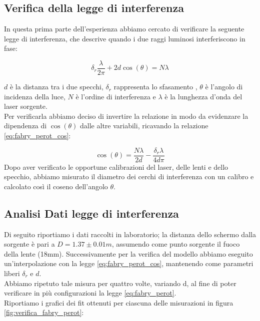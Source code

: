 \documentclass[letterpaper,12pt]{article}
\begin{document}
\subsection{Verifica della legge di interferenza}

In questa prima parte dell'esperienza abbiamo cercato di verificare
la seguente legge di interferenza, che descrive quando i due raggi luminosi interferiscono in fase:

\begin{equation}
    \delta_r \frac{\lambda}{2 \pi} + 2d \cos(\theta) = N \lambda
    \label{eq:fabry_perot}
\end{equation}

$d$ è la distanza tra i due specchi, $\delta_r$ rappresenta lo sfasamento , $\theta$ è l'angolo di incidenza della luce, $N$ è l'ordine di interferenza e $\lambda$ 
è la lunghezza d'onda del laser sorgente. \\
Per verificarla abbiamo deciso di invertire la relazione in modo da evidenzare la dipendenza di $\cos(\theta)$ dalle
altre variabili, ricavando la relazione \ref{eq:fabry_perot_cos}:

\begin{equation}
    \cos(\theta) = \frac{N \lambda}{2d} - \frac{\delta_r \lambda}{4 d \pi}
    \label{eq:fabry_perot_cos}
\end{equation}
Dopo aver verificato le opportune calibrazioni del laser, delle lenti e dello specchio,
abbiamo misurato il diametro dei cerchi di interferenza con un calibro e calcolato così il coseno dell'angolo $\theta$.\\

\subsection{Analisi Dati legge di interferenza}
Di seguito riportiamo i dati raccolti in laboratorio; la distanza dello schermo dalla sorgente è pari a $D = 1.37 \pm0.01 m$, assumendo come punto sorgente il fuoco della lente 
(18mm). Successivamente per la verifica del modello abbiamo eseguito un'interpolazione con la legge \ref{eq:fabry_perot_cos}, mantenendo come 
parametri liberi $\delta_r$ e $d$.\\
Abbiamo ripetuto tale misura per quattro volte, variando d, al fine di poter verificare in più configurazioni la 
legge \ref{eq:fabry_perot}.\\
Riportiamo i grafici dei fit ottenuti per ciascuna delle misurazioni in figura \ref{fig:verifica_fabry_perot}:
\end{document}
